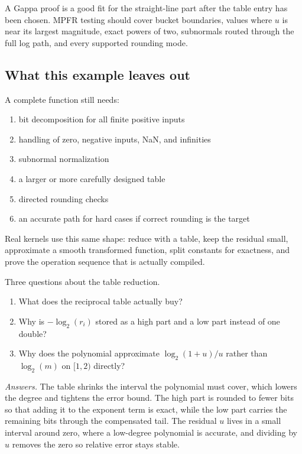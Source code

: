 \documentclass[manuscript, nonacm]{acmart}
\begin{document}
  A Gappa proof is a good fit for the straight-line part after the table entry
  has been chosen. MPFR testing should cover bucket boundaries, values where
  $u$ is near its largest magnitude, exact powers of two, subnormals routed
  through the full log path, and every supported rounding mode.

  \subsection{What this example leaves out}

  A complete function still needs:

  \begin{enumerate}
    \item bit decomposition for all finite positive inputs
    \item handling of zero, negative inputs, NaN, and infinities
    \item subnormal normalization
    \item a larger or more carefully designed table
    \item directed rounding checks
    \item an accurate path for hard cases if correct rounding is the target
  \end{enumerate}

  Real kernels use this same shape: reduce with a table, keep the residual
  small, approximate a smooth transformed function, split constants for
  exactness, and prove the operation sequence that is actually compiled.

  \begin{checkpoint}
    Three questions about the table reduction.
    \begin{enumerate}
      \item What does the reciprocal table actually buy?
      \item Why is $-\log_2(r_i)$ stored as a high part and a low part instead
      of one double?
      \item Why does the polynomial approximate $\log_2(1 + u)/u$ rather than
      $\log_2(m)$ on $[1, 2)$ directly?
    \end{enumerate}
    \emph{Answers.}  The table shrinks the interval the polynomial must
    cover, which lowers the degree and tightens the error bound. The high
    part is rounded to fewer bits so that adding it to the exponent term is
    exact, while the low part carries the remaining bits through the
    compensated tail. The residual $u$ lives in a small interval around
    zero, where a low-degree polynomial is accurate, and dividing by $u$
    removes the zero so relative error stays stable.
  \end{checkpoint}
\end{document}
